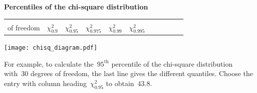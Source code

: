 \documentclass[a4paper]{article}
\begin{document}
\begin{center}
  {\Large\bf Percentiles of the chi-square distribution}
\end{center}

\rule{0mm}{5mm}
\pagestyle{empty}
\thispagestyle{empty}
\begin{table}[ht]
\centering
\begin{tabular}{r|llllllllll}
  \begin{minipage}{20mm}degrees\\of freedom\end{minipage}
  & {\Large $\chi^2_{0.9}$}
  & {\Large $\chi^2_{0.95}$}
  & {\Large $\chi^2_{0.975}$}
  & {\Large $\chi^2_{0.99}$}
  & {\Large $\chi^2_{0.995}$}
  \rule[-4mm]{0mm}{10mm}
  \\  \hline

  \hline
\end{tabular}
\end{table}

\begin{centering}
\texttt{[image: chisq\_diagram.pdf]}
\end{centering}

\noindent For example, to calculate the~$95^\mathrm{th}$ percentile of
the chi-square distribution with~30 degrees of freedom, the last line
gives the different quantiles.  Choose the entry with column
heading~$\chi^2_{0.95}$ to obtain~43.8.
\\
\end{document}
